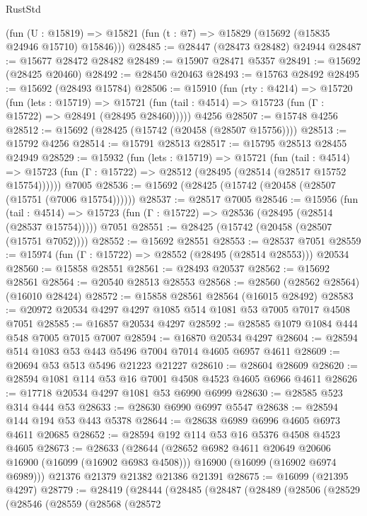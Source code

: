\begin{lexlean}{RustStd}
\begin{coremodule}
    (fun (U : @15819) => @15821 (fun (t : @7) => @15829 (@15692 (@15835 @24946 @15710) @15846)))
@28485 := @28447 (@28473 @28482) @24944
@28487 := @15677 @28472 @28482
@28489 := @15907 @28471 @5357
@28491 := @15692 (@28425 @20460)
@28492 := @28450 @20463
@28493 := @15763 @28492
@28495 := @15692 (@28493 @15784)
@28506 := @15910
    (fun (rty : @4214) =>
    @15720
      (fun (lets : @15719) =>
      @15721 (fun (tail : @4514) => @15723 (fun (Γ : @15722) => @28491 (@28495 @28460)))))
    @4256
@28507 := @15748 @4256
@28512 := @15692 (@28425 (@15742 (@20458 (@28507 @15756))))
@28513 := @15792 @4256
@28514 := @15791 @28513
@28517 := @15795 @28513 @28455 @24949
@28529 := @15932
    (fun (lets : @15719) =>
    @15721
      (fun (tail : @4514) =>
      @15723 (fun (Γ : @15722) => @28512 (@28495 (@28514 (@28517 @15752 @15754))))))
    @7005
@28536 := @15692 (@28425 (@15742 (@20458 (@28507 (@15751 (@7006 @15754))))))
@28537 := @28517 @7005
@28546 := @15956
    (fun (tail : @4514) => @15723 (fun (Γ : @15722) => @28536 (@28495 (@28514 (@28537 @15754)))))
    @7051
@28551 := @28425 (@15742 (@20458 (@28507 (@15751 @7052))))
@28552 := @15692 @28551
@28553 := @28537 @7051
@28559 := @15974 (fun (Γ : @15722) => @28552 (@28495 (@28514 @28553))) @20534
@28560 := @15858 @28551
@28561 := @28493 @20537
@28562 := @15692 @28561
@28564 := @20540 @28513 @28553
@28568 := @28560 (@28562 @28564) (@16010 @28424)
@28572 := @15858 @28561 @28564 (@16015 @28492)
@28583 := @20972 @20534 @4297 @4297 @1085 @514 @1081 @53 @7005 @7017 @4508 @7051
@28585 := @16857 @20534 @4297
@28592 := @28585 @1079 @1084 @444 @548 @7005 @7015 @7007
@28594 := @16870 @20534 @4297
@28604 := @28594 @514 @1083 @53 @443 @5496 @7004 @7014 @4605 @6957 @4611
@28609 := @20694 @53 @513 @5496 @21223 @21227
@28610 := @28604 @28609
@28620 := @28594 @1081 @114 @53 @16 @7001 @4508 @4523 @4605 @6966 @4611
@28626 := @17718 @20534 @4297 @1081 @53 @6990 @6999
@28630 := @28585 @523 @314 @444 @53
@28633 := @28630 @6990 @6997 @5547
@28638 := @28594 @144 @194 @53 @443 @5378
@28644 := @28638 @6989 @6996 @4605 @6973 @4611 @20685
@28652 := @28594 @192 @114 @53 @16 @5376 @4508 @4523 @4605
@28673 := @28633
    (@28644
      (@28652 @6982 @4611 @20649 @20606 @16900 (@16099 (@16902 @6983 @4508)))
      @16900
      (@16099 (@16902 @6974 @6989)))
    @21376
    @21379
    @21382
    @21386
    @21391
@28675 := @16099 (@21395 @4297)
@28779 := @28419
    (@28444
      (@28485
        (@28487
          (@28489
            (@28506
              (@28529
                (@28546
                  (@28559
                    (@28568
                      (@28572

\end{coremodule}
\end{lexlean}
